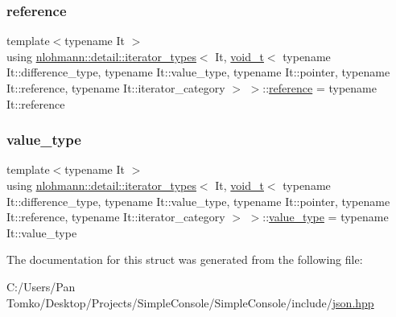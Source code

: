 \subsubsection{\texorpdfstring{reference}{reference}}
{\footnotesize\ttfamily template$<$typename It $>$ \\
using \mbox{\hyperlink{structnlohmann_1_1detail_1_1iterator__types}{nlohmann\+::detail\+::iterator\+\_\+types}}$<$ It, \mbox{\hyperlink{namespacenlohmann_1_1detail_a92a167c49c6697b6ffe4f79492c705e5}{void\+\_\+t}}$<$ typename It\+::difference\+\_\+type, typename It\+::value\+\_\+type, typename It\+::pointer, typename It\+::reference, typename It\+::iterator\+\_\+category $>$ $>$\+::\mbox{\hyperlink{structnlohmann_1_1detail_1_1iterator__types_3_01_it_00_01void__t_3_01typename_01_it_1_1differenc4a413e9bd546446175f10f15c5631361_a5e82d2d8dabd022b8ff916f2e83a82f2}{reference}} =  typename It\+::reference}

\mbox{\label{structnlohmann_1_1detail_1_1iterator__types_3_01_it_00_01void__t_3_01typename_01_it_1_1differenc4a413e9bd546446175f10f15c5631361_ac70fcab4cacd8b386c3f2b056885e15e}} 
\subsubsection{\texorpdfstring{value\_type}{value\_type}}
{\footnotesize\ttfamily template$<$typename It $>$ \\
using \mbox{\hyperlink{structnlohmann_1_1detail_1_1iterator__types}{nlohmann\+::detail\+::iterator\+\_\+types}}$<$ It, \mbox{\hyperlink{namespacenlohmann_1_1detail_a92a167c49c6697b6ffe4f79492c705e5}{void\+\_\+t}}$<$ typename It\+::difference\+\_\+type, typename It\+::value\+\_\+type, typename It\+::pointer, typename It\+::reference, typename It\+::iterator\+\_\+category $>$ $>$\+::\mbox{\hyperlink{structnlohmann_1_1detail_1_1iterator__types_3_01_it_00_01void__t_3_01typename_01_it_1_1differenc4a413e9bd546446175f10f15c5631361_ac70fcab4cacd8b386c3f2b056885e15e}{value\+\_\+type}} =  typename It\+::value\+\_\+type}



The documentation for this struct was generated from the following file\+:\begin{DoxyCompactItemize}
\item 
C\+:/\+Users/\+Pan Tomko/\+Desktop/\+Projects/\+Simple\+Console/\+Simple\+Console/include/\mbox{\hyperlink{json_8hpp}{json.\+hpp}}\end{DoxyCompactItemize}
